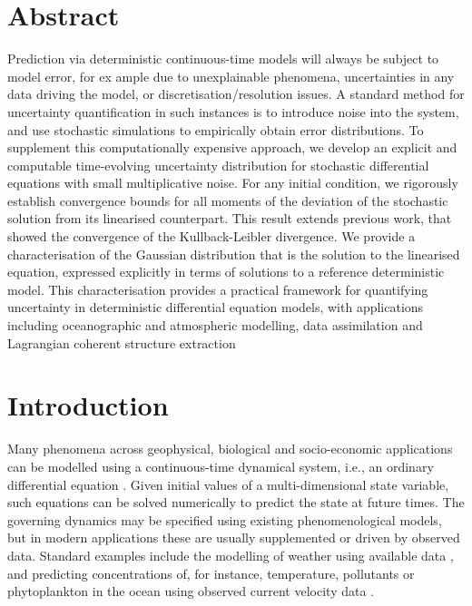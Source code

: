 \section{Abstract}\label{sec:paper1_abstract}
Prediction via deterministic continuous-time models will always be subject to model error, for ex ample due to unexplainable phenomena, uncertainties in any data driving the model, or discretisation/resolution issues. 
A standard method for uncertainty quantification in such instances is to introduce noise into the system, and use stochastic simulations to empirically obtain error distributions. 
To supplement this computationally expensive approach, we develop an explicit and computable time-evolving uncertainty distribution for stochastic differential equations with small multiplicative noise. 
For any initial condition, we rigorously establish convergence bounds for all moments of the deviation of the stochastic solution from its linearised counterpart. 
This result extends previous work, that showed the convergence of the Kullback-Leibler divergence. We provide a characterisation of the Gaussian distribution that is the solution to the linearised equation, expressed explicitly in terms of solutions to a reference deterministic model.
This characterisation provides a practical framework for quantifying uncertainty in deterministic differential equation models, with applications including oceanographic and atmospheric modelling, data assimilation and Lagrangian coherent structure extraction

\section{Introduction}\label{sec:paper1_intro}
Many phenomena across geophysical, biological and socio-economic applications can be modelled using a continuous-time dynamical system, i.e., an ordinary differential equation \cite[e.g.]{BrauerCastillo-Chavez_2012_MathematicalModelsPopulation,TelEtAl_2005_ChemicalBiologicalActivity,Wiggins_2005_DynamicalSystemsApproach}. 
Given initial values of a multi-dimensional state variable, such equations can be solved numerically to predict the state at future times.
The governing dynamics may be specified using existing phenomenological models, but in modern applications these are usually supplemented or driven by observed data.  
Standard examples include the modelling of weather using available data \cite{LawEtAl_2015_DataAssimilationMathematical,ReichCotter_2015_ProbabilisticForecastingBayesian}, and predicting concentrations of, for instance, temperature, pollutants or phytoplankton in the ocean using observed current velocity data \cite{AbascalEtAl_2009_ApplicationHFRadar,dOvidioEtAl_2010_FluidDynamicalNiches}.

